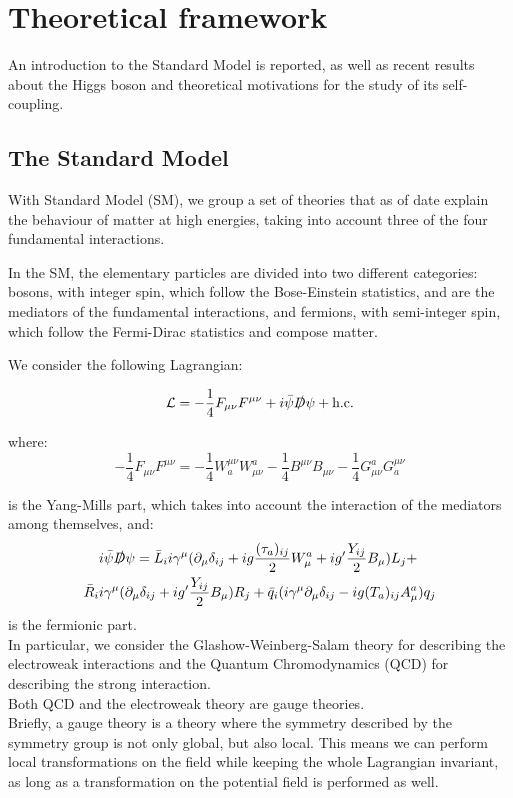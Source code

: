 \chapter{Theoretical framework}
\label{chap:chapter_2}
An introduction to the Standard Model is reported, as well as recent results about the Higgs boson and theoretical motivations for the study of its self-coupling.

\section{The Standard Model}

With Standard Model (SM), we group a set of theories that as of date explain the behaviour of matter at high energies, taking into account three of the four fundamental interactions. 

In the SM, the elementary particles are divided into two different categories: bosons, with integer spin, which follow the Bose-Einstein statistics, and are the mediators of the fundamental interactions, and fermions, with semi-integer spin, which follow the Fermi-Dirac statistics and compose matter.

We consider the following Lagrangian:

\begin{equation}
    \mathcal{L} = -\frac{1}{4}F_{\mu \nu}F^{\mu \nu} + i\bar{\psi}\slashed{D}\psi + \text{h.c.}
\end{equation}

where:
\begin{equation}
     -\frac{1}{4}F_{\mu \nu}F^{\mu \nu} = - \frac{1}{4}W_a^{\mu\nu} W_{\mu\nu}^a - \frac{1}{4} B^{\mu\nu}B_{\mu\nu} -\frac{1}{4}G_{\mu \nu}^a G^{\mu \nu}_a
\end{equation}

is the Yang-Mills part, which takes into account the interaction of the mediators among themselves, and:
\begin{align}
    &i\bar{\psi}\slashed{D}\psi = \bar{L}_i i\gamma^{\mu}(\partial_{\mu}\delta_{ij} + i g \frac{(\tau_a)_{ij}}{2}W_{\mu}^a + i g' \frac{Y_{ij}}{2}B_{\mu})L_j + \\ \bar{R}_i &i\gamma^{\mu}(\partial_{\mu}\delta_{ij} + i g' \frac{Y_{ij}}{2}B_{\mu})R_j 
    + \Bar{q}_i(i\gamma^{\mu}\partial_{\mu} \delta_{ij} - i g (T_a)_{ij}A^a_{\mu})q_j \nonumber
\end{align}
is the fermionic part.\\
In particular, we consider the Glashow-Weinberg-Salam theory for describing the electroweak interactions and the Quantum Chromodynamics (QCD) for describing the strong interaction.\\
Both QCD and the electroweak theory are gauge theories. \\
Briefly, a gauge theory is a theory where the symmetry described by the symmetry group is not only global, but also local. This means we can perform local transformations on the field while keeping the whole Lagrangian invariant, as long as a transformation on the potential field is performed as well.\\



